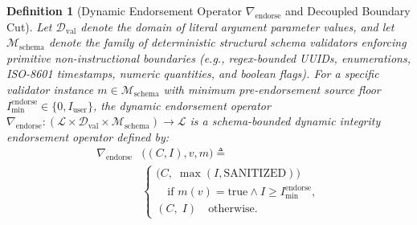 \documentclass[conference,10pt]{IEEEtran}
\newtheorem{definition}{Definition}
\begin{document}
\begin{definition}[Dynamic Endorsement Operator $\nabla_{\text{endorse}}$ and Decoupled Boundary Cut]
\label{def:endorse}
Let $\mathcal{D}_{\text{val}}$ denote the domain of literal argument parameter values, and let $\mathcal{M}_{\text{schema}}$ denote the family of deterministic structural schema validators enforcing primitive non-instructional boundaries (e.g., regex-bounded UUIDs, enumerations, ISO-8601 timestamps, numeric quantities, and boolean flags). For a specific validator instance $m \in \mathcal{M}_{\text{schema}}$ with minimum pre-endorsement source floor $I_{\text{min}}^{\text{endorse}} \in \{0, I_{\text{user}}\}$, the dynamic endorsement operator $\nabla_{\text{endorse}} : (\mathcal{L} \times \mathcal{D}_{\text{val}} \times \mathcal{M}_{\text{schema}}) \to \mathcal{L}$ is a schema-bounded dynamic integrity endorsement operator defined by:
\begin{equation}
\begin{split}
\nabla_{\text{endorse}}&\big((C, I), v, m\big) \triangleq \\
&\begin{cases}
\big(C, \; \max(I, \text{SANITIZED})\big) \\
\quad \text{if } m(v) = \text{true} \land I \ge I_{\text{min}}^{\text{endorse}}, \\
(C, \; I) \quad \text{otherwise.}
\end{cases}
\end{split}
\end{equation}

\end{definition}
\end{document}
